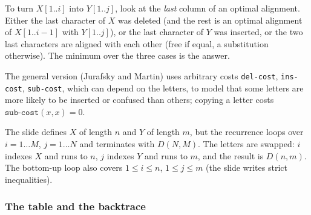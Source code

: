 \begin{nbintuition}
To turn $X[1..i]$ into $Y[1..j]$, look at the \emph{last} column of an optimal
alignment. Either the last character of $X$ was deleted (and the rest is an optimal
alignment of $X[1..i-1]$ with $Y[1..j]$), or the last character of $Y$ was inserted, or
the two last characters are aligned with each other (free if equal, a substitution
otherwise). The minimum over the three cases is the answer.
\end{nbintuition}

The general version (Jurafsky and Martin) uses arbitrary costs \texttt{del-cost},
\texttt{ins-cost}, \texttt{sub-cost}, which can depend on the letters, to model that some
letters are more likely to be inserted or confused than others; copying a letter costs
$\texttt{sub-cost}(x,x) = 0$.

\begin{nbwarning}
The slide defines $X$ of length $n$ and $Y$ of length $m$, but the recurrence loops over
$i = 1\dots M$, $j = 1\dots N$ and terminates with $D(N, M)$. The letters are swapped:
$i$ indexes $X$ and runs to $n$, $j$ indexes $Y$ and runs to $m$, and the result is
$D(n,m)$. The bottom-up loop also covers $1 \le i \le n$, $1 \le j \le m$ (the slide
writes strict inequalities).
\end{nbwarning}

\subsubsection{The table and the backtrace}

